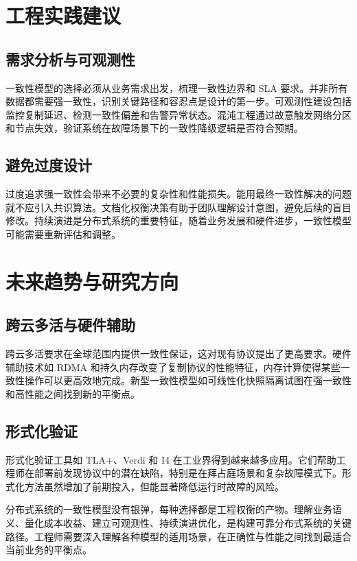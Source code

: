 \chapter{工程实践建议}
\section{需求分析与可观测性}
一致性模型的选择必须从业务需求出发，梳理一致性边界和 SLA 要求。并非所有数据都需要强一致性，识别关键路径和容忍点是设计的第一步。可观测性建设包括监控复制延迟、检测一致性偏差和告警异常状态。混沌工程通过故意触发网络分区和节点失效，验证系统在故障场景下的一致性降级逻辑是否符合预期。\par
\section{避免过度设计}
过度追求强一致性会带来不必要的复杂性和性能损失。能用最终一致性解决的问题就不应引入共识算法。文档化权衡决策有助于团队理解设计意图，避免后续的盲目修改。持续演进是分布式系统的重要特征，随着业务发展和硬件进步，一致性模型可能需要重新评估和调整。\par
\chapter{未来趋势与研究方向}
\section{跨云多活与硬件辅助}
跨云多活要求在全球范围内提供一致性保证，这对现有协议提出了更高要求。硬件辅助技术如 RDMA 和持久内存改变了复制协议的性能特征，内存计算使得某些一致性操作可以更高效地完成。新型一致性模型如可线性化快照隔离试图在强一致性和高性能之间找到新的平衡点。\par
\section{形式化验证}
形式化验证工具如 TLA+、Verdi 和 I4 在工业界得到越来越多应用。它们帮助工程师在部署前发现协议中的潜在缺陷，特别是在拜占庭场景和复杂故障模式下。形式化方法虽然增加了前期投入，但能显著降低运行时故障的风险。\par
分布式系统的一致性模型没有银弹，每种选择都是工程权衡的产物。理解业务语义、量化成本收益、建立可观测性、持续演进优化，是构建可靠分布式系统的关键路径。工程师需要深入理解各种模型的适用场景，在正确性与性能之间找到最适合当前业务的平衡点。\par
